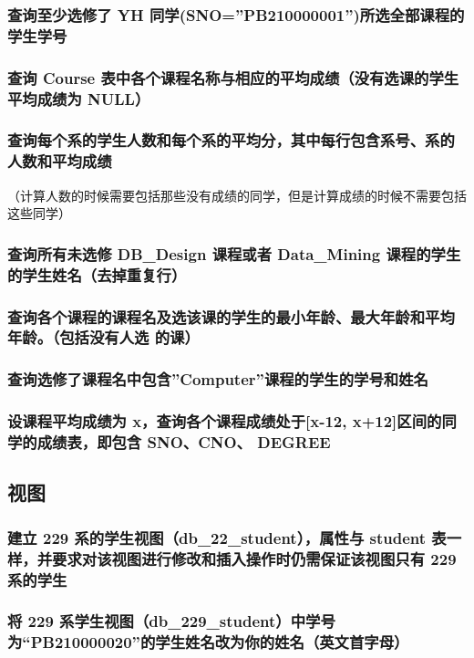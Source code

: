 \documentclass{ctexart}
\begin{document}
\subsubsection{查询至少选修了 YH 同学(SNO=”PB210000001”)所选全部课程的学生学号}
\subsubsection{查询 Course 表中各个课程名称与相应的平均成绩（没有选课的学生平均成绩为 NULL） }
\subsubsection{查询每个系的学生人数和每个系的平均分，其中每行包含系号、系的人数和平均成绩}
（计算人数的时候需要包括那些没有成绩的同学，但是计算成绩的时候不需要包括这些同学）
\subsubsection{查询所有未选修 DB\_Design 课程或者 Data\_Mining 课程的学生的学生姓名（去掉重复行）}
\subsubsection{查询各个课程的课程名及选该课的学生的最小年龄、最大年龄和平均年龄。（包括没有人选
的课）}
\subsubsection{查询选修了课程名中包含”Computer”课程的学生的学号和姓名}
\subsubsection{设课程平均成绩为 x，查询各个课程成绩处于[x-12, x+12]区间的同学的成绩表，即包含 SNO、CNO、 DEGREE}
\subsection{视图}
\subsubsection{建立 229 系的学生视图（db\_22\_student），属性与 student 表一样，并要求对该视图进行修改和插入操作时仍需保证该视图只有 229 系的学生}
\subsubsection{将 229 系学生视图（db\_229\_student）中学号为“PB210000020”的学生姓名改为{你的姓名（英文首字母）}}
\end{document}
